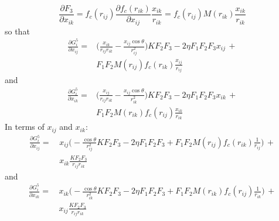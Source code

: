 \documentclass[twoside,english]{uiofysmaster}
\begin{document}
\begin{appendices}
\begin{equation}
  \frac{\partial F_3}{\partial x_{ik}} = f_c(r_{ij})
 \frac{\partial f_c(r_{ik})}{\partial x_{ij}}\frac{x_{ik}}{r_{ik}} = 
 f_c(r_{ij})M(r_{ik})\frac{x_{ik}}{r_{ik}}
\end{equation}
so that
\begin{align}
 \frac{\partial G_i^5}{\partial x_{ij}} = &\biggr(\frac{x_{ik}}{r_{ij}r_{ik}} - \frac{x_{ij}\cos\theta}{r_{ij}^2}
 \biggr)KF_2F_3 -
 2\eta F_1 F_2F_3 x_{ij} \, + \\
 &F_1F_2 M(r_{ij})f_c(r_{ik})\frac{x_{ij}}{r_{ij}}
\end{align}
and 
\begin{align}
 \frac{\partial G_i^5}{\partial x_{ik}} = &\biggr(\frac{x_{ij}}{r_{ij}r_{ik}} - \frac{x_{ij}\cos\theta}{r_{ik}^2}
 \biggr)KF_2F_3 -
 2\eta F_1 F_2F_3 x_{ik} \, + \\
 &F_1F_2 M(r_{ik})f_c(r_{ij})\frac{x_{ik}}{r_{ik}}
\end{align}
In terms of $x_{ij}$ and $x_{ik}$:
\begin{align}
 \frac{\partial G_i^5}{\partial x_{ij}} = \, &x_{ij} \biggr(-\frac{\cos\theta}{r_{ij}^2}K
 F_2F_3 - 2\eta F_1F_2F_3 + F_1F_2M(r_{ij})f_c(r_{ik})\frac{1}{r_{ij}} \biggr) \, + \\
 &x_{ik}\frac{KF_2F_3}{r_{ij}r_{ik}}
\end{align}
and 
\begin{align}
 \frac{\partial G_i^5}{\partial x_{ik}} = \, &x_{ik} \biggr(-\frac{\cos\theta}{r_{ik}^2}K
 F_2F_3 - 2\eta F_1F_2F_3 + F_1F_2M(r_{ik})f_c(r_{ij})\frac{1}{r_{ik}} \biggr) \, + \\
 &x_{ij}\frac{KF_2F_3}{r_{ij}r_{ik}}
\end{align}



\end{appendices}
\end{document}
